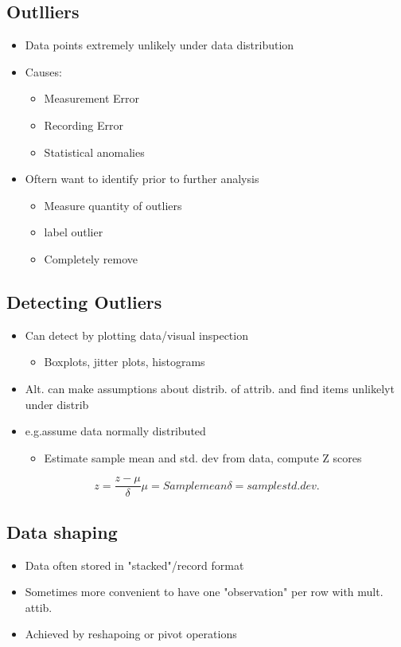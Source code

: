 \documentclass[a4paper]{article}
\begin{document}
\subsection{Outlliers}
\begin{itemize}
	\item Data points extremely unlikely under data distribution
	\item Causes:
	\begin{itemize}
		\item Measurement Error
		\item Recording Error
		\item Statistical anomalies
	\end{itemize}
\item Oftern want to identify prior to further analysis
	\begin{itemize}
		\item Measure quantity of outliers
		\item label outlier
		\item Completely remove
	\end{itemize}
\end{itemize}
\subsection{Detecting Outliers}
\begin{itemize}
	\item Can detect by plotting data/visual inspection
		\begin{itemize}
			\item Boxplots, jitter plots, histograms
		\end{itemize}
	\item Alt. can make assumptions about distrib. of attrib. and find items
		unlikelyt under distrib
	\item e.g.assume data normally distributed
	\begin{itemize}
		\item Estimate sample mean and std. dev from data, compute Z
			scores
	\end{itemize}
\end{itemize}
\[
	z = \frac{z-\mu}{\delta}
	\mu = Sample mean
	\delta = sample std. dev
.\]
\subsection{Data shaping}
\begin{itemize}
	\item Data often stored in "stacked"/record format
	\item Sometimes more convenient to have one "observation" per row with
		mult. attib.
	\item Achieved by reshapoing or pivot operations
\end{itemize}
\end{document}
